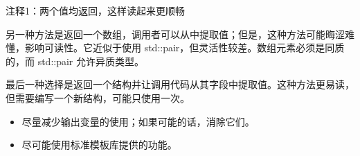 {\footnotesize
注释1：两个值均返回，这样读起来更顺畅
}

另一种方法是返回一个数组，调用者可以从中提取值；但是，这种方法可能晦涩难懂，影响可读性。它近似于使用 std::pair，但灵活性较差。数组元素必须是同质的，而 std::pair 允许异质类型。

最后一种选择是返回一个结构并让调用代码从其字段中提取值。这种方法更易读，但需要编写一个新结构，可能只使用一次。


\begin{itemize}
\item
尽量减少输出变量的使用；如果可能的话，消除它们。

\item
尽可能使用标准模板库提供的功能。
\end{itemize}




